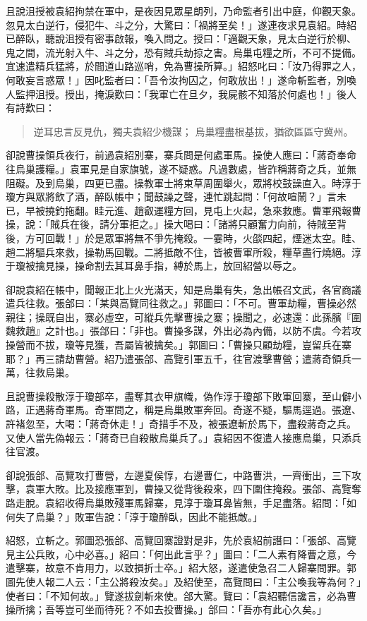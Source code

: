 且說沮授被袁紹拘禁在軍中，是夜因見眾星朗列，乃命監者引出中庭，仰觀天象。忽見太白逆行，侵犯牛、斗之分，大驚曰：「禍將至矣！」遂連夜求見袁紹。時紹已醉臥，聽說沮授有密事啟報，喚入問之。授曰：「適觀天象，見太白逆行於柳、鬼之間，流光射入牛、斗之分，恐有賊兵劫掠之害。烏巢屯糧之所，不可不提備。宜速遣精兵猛將，於間道山路巡哨，免為曹操所算。」紹怒叱曰：「汝乃得罪之人，何敢妄言惑眾！」因叱監者曰：「吾令汝拘囚之，何敢放出！」遂命斬監者，別喚人監押沮授。授出，掩淚歎曰：「我軍亡在旦夕，我屍骸不知落於何處也！」後人有詩歎曰：

\begin{quote}
逆耳忠言反見仇，獨夫袁紹少機謀；
烏巢糧盡根基拔，猶欲區區守冀州。
\end{quote}

卻說曹操領兵夜行，前過袁紹別寨，寨兵問是何處軍馬。操使人應曰：「蔣奇奉命往烏巢護糧。」袁軍見是自家旗號，遂不疑惑。凡過數處，皆詐稱蔣奇之兵，並無阻礙。及到烏巢，四更已盡。操教軍士將束草周圍舉火，眾將校鼓譟直入。時淳于瓊方與眾將飲了酒，醉臥帳中；聞鼓譟之聲，連忙跳起問：「何故喧鬧？」言未已，早被撓釣拖翻。眭元進、趙叡運糧方回，見屯上火起，急來救應。曹軍飛報曹操，說：「賊兵在後，請分軍拒之。」操大喝曰：「諸將只顧奮力向前，待賊至背後，方可回戰！」於是眾軍將無不爭先掩殺。一霎時，火燄四起，煙迷太空。眭、趙二將驅兵來救，操勒馬回戰。二將抵敵不住，皆被曹軍所殺，糧草盡行燒絕。淳于瓊被擒見操，操命割去其耳鼻手指，縛於馬上，放回紹營以辱之。

卻說袁紹在帳中，聞報正北上火光滿天，知是烏巢有失，急出帳召文武，各官商議遣兵往救。張郃曰：「某與高覽同往救之。」郭圖曰：「不可。曹軍劫糧，曹操必然親往；操既自出，寨必虛空，可縱兵先擊曹操之寨；操聞之，必速還：此孫臏『圍魏救趙』之計也。」張郃曰：「非也。曹操多謀，外出必為內備，以防不虞。今若攻操營而不拔，瓊等見獲，吾屬皆被擒矣。」郭圖曰：「曹操只顧劫糧，豈留兵在寨耶？」再三請劫曹營。紹乃遣張郃、高覽引軍五千，往官渡擊曹營；遣蔣奇領兵一萬，往救烏巢。

且說曹操殺散淳于瓊部卒，盡奪其衣甲旗幟，偽作淳于瓊部下敗軍回寨，至山僻小路，正遇蔣奇軍馬。奇軍問之，稱是烏巢敗軍奔回。奇遂不疑，驅馬逕過。張遼、許褚忽至，大喝：「蔣奇休走！」奇措手不及，被張遼斬於馬下，盡殺蔣奇之兵。又使人當先偽報云：「蔣奇已自殺散烏巢兵了。」袁紹因不復遣人接應烏巢，只添兵往官渡。

卻說張郃、高覽攻打曹營，左邊夏侯惇，右邊曹仁，中路曹洪，一齊衝出，三下攻擊，袁軍大敗。比及接應軍到，曹操又從背後殺來，四下圍住掩殺。張郃、高覽奪路走脫。袁紹收得烏巢敗殘軍馬歸寨，見淳于瓊耳鼻皆無，手足盡落。紹問：「如何失了烏巢？」敗軍告說：「淳于瓊醉臥，因此不能抵敵。」

紹怒，立斬之。郭圖恐張郃、高覽回寨證對是非，先於袁紹前譖曰：「張郃、高覽見主公兵敗，心中必喜。」紹曰：「何出此言乎？」圖曰：「二人素有降曹之意，今遣擊寨，故意不肯用力，以致損折士卒。」紹大怒，遂遣使急召二人歸寨問罪。郭圖先使人報二人云：「主公將殺汝矣。」及紹使至，高覽問曰：「主公喚我等為何？」使者曰：「不知何故。」覽遂拔劍斬來使。郃大驚。覽曰：「袁紹聽信讒言，必為曹操所擒；吾等豈可坐而待死？不如去投曹操。」郃曰：「吾亦有此心久矣。」

